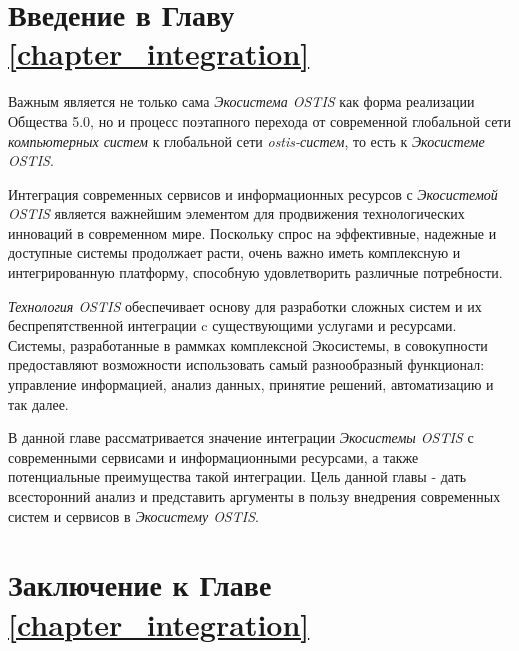 \section*{Введение в Главу \ref{chapter_integration}}
Важным является не только сама \textit{Экосистема OSTIS} как форма реализации Общества 5.0, но и процесс поэтапного перехода от современной глобальной сети \textit{компьютерных систем} к глобальной сети \textit{ostis-систем}, то есть к \textit{Экосистеме OSTIS}.

Интеграция современных сервисов и информационных ресурсов с \textit{Экосистемой OSTIS} является важнейшим элементом для продвижения технологических инноваций в современном мире. Поскольку спрос на эффективные, надежные и доступные системы продолжает расти, очень важно иметь комплексную и интегрированную платформу, способную удовлетворить различные потребности.

\textit{Технология OSTIS} обеспечивает основу для разработки сложных систем и их беспрепятственной интеграции c существующими услугами и ресурсами. Системы, разработанные в раммках комплексной Экосистемы, в совокупности предоставляют возможности использовать самый разнообразный функционал: управление информацией, анализ данных, принятие решений, автоматизацию и так далее.

В данной главе рассматривается значение интеграции \textit{Экосистемы OSTIS} с современными сервисами и информационными ресурсами, а также потенциальные преимущества такой интеграции. 
Цель данной главы - дать всесторонний анализ и представить аргументы в пользу внедрения современных систем и сервисов в \textit{Экосистему OSTIS}.






%
\section*{Заключение к Главе \ref{chapter_integration}}

